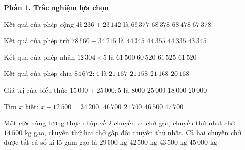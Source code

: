 \textbf{Phần 1. Trắc nghiệm lựa chọn}

\begin{ex} %
Kết quả của phép cộng $45\,236 + 23\,142$ là
\choice
{$68\,377$}
{\True $68\,378$}
{$68\,478$}
{$67\,378$}
\end{ex}

\begin{ex} %
Kết quả của phép trừ $78\,560 - 34\,215$ là
\choice
{\True $44\,345$}
{$44\,355$}
{$44\,335$}
{$43\,345$}
\end{ex}

\begin{ex} %
Kết quả của phép nhân $12\,304 \times 5$ là
\choice
{$61\,500$}
{$60\,520$}
{$61\,525$}
{\True $61\,520$}
\end{ex}

\begin{ex} %
Kết quả của phép chia $84\,672 : 4$ là
\choice
{$21\,167$}
{$21\,158$}
{\True $21\,168$}
{$20\,168$}
\end{ex}

\begin{ex} %
Giá trị của biểu thức $15\,000 + 25\,000 : 5$ là
\choice
{$8000$}
{$25\,000$}
{$18\,000$}
{\True $20\,000$}
\end{ex}

\begin{ex} %
Tìm $x$ biết: $x - 12\,500 = 34\,200$.
\choice
{\True $46\,700$}
{$21\,700$}
{$46\,500$}
{$47\,700$}
\end{ex}

\begin{ex} %
Một cửa hàng lương thực nhập về $2$ chuyến xe chở gạo, chuyến thứ nhất chở $14\,500\text{ kg}$ gạo, chuyến thứ hai chở gấp đôi chuyến thứ nhất. Cả hai chuyến chở được tất cả số ki-lô-gam gạo là
\choice
{$29\,000\text{ kg}$}
{$42\,500\text{ kg}$}
{\True $43\,500\text{ kg}$}
{$45\,000\text{ kg}$}
\end{ex}

